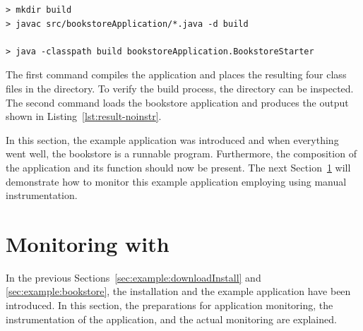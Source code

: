 \setBashListing
% 
\begin{lstlisting}[label=lst:bookstoreStarterNoInstr, caption=Commands to compile and run the Bookstore application]
> mkdir build
> javac src/bookstoreApplication/*.java -d build

> java -classpath build bookstoreApplication.BookstoreStarter 
\end{lstlisting}

\noindent The first command compiles the application and places the resulting four class files in the  directory. To verify the build process, the  directory can be inspected. The second command loads the bookstore application and produces the output shown in Listing~\ref{lst:result-noinstr}.



\noindent In this section, the \Kieker{} example application was introduced and when everything went well, the bookstore is a runnable program. Furthermore, the composition of the application and its function should now be present. %
The next Section~\ref{sec:example:monitoring} will demonstrate how %
to monitor this example application employing \KiekerMonitoringPart{} using manual instrumentation.

\pagebreak

\section{Monitoring with \KiekerMonitoringPart{}}\label{sec:example:monitoring}

In the previous Sections~\ref{sec:example:downloadInstall} and \ref{sec:example:bookstore}, the \Kieker{} installation and the example application have been introduced. In this section, the preparations for application monitoring, the instrumentation of the application, and the actual monitoring are explained.

\quad\


